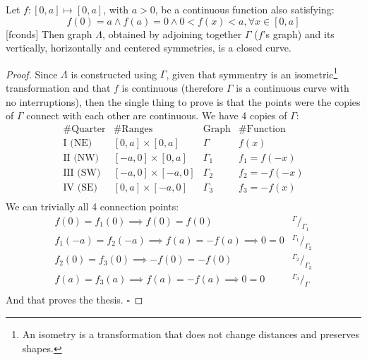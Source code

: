 \documentclass{layout}
\begin{document}
\begin{lemma}
Let $f:[0,a] \mapsto [0,a]$, with $a > 0$, be a continuous function also satisfying:
\begin{equation}
f(0)=a \wedge f(a)=0 \wedge 0 < f(x) < a, \forall x \in [0,a]
\end{equation}[fconds]
Then graph $\Lambda$, obtained by adjoining together $\Gamma$ ($f$'s graph) and
its vertically, horizontally and centered symmetries, is a closed curve.
\begin{proof}
Since $\Lambda$ is constructed using $\Gamma$, given that symmentry is an 
isometric\footnote{An isometry is a transformation that does not change distances and
preserves shapes.} 
transformation and that $f$ is continuous (therefore $\Gamma$ is a continuous curve
with no interruptions), then the single thing to prove is that the points were
the copies of $\Gamma$ connect with each other are continuous. We have 4
copies of $\Gamma$:
\begin{equation*}
\begin{array}{c|c|c|c}
\text{\# Quarter} & \text{\# Ranges} & \text{Graph} & \text{\# Function} \\
\hline
\text{I (NE)} & [0,a] \times [0,a] & \Gamma & f(x) \\
\text{II (NW)} & [-a,0] \times [0,a] & \Gamma_1 & f_1 = f(-x) \\
\text{III (SW)} & [-a,0] \times [-a,0] & \Gamma_2 & f_2 = -f(-x) \\
\text{IV (SE)} & [0,a] \times [-a,0] & \Gamma_3 & f_3 = -f(x) \\
\end{array}
\end{equation*}
We can trivially all 4 connection points:
\begin{equation*}
\begin{array}{l|c}
f(0) = f_1(0) \implies f(0) = f(0) & ^{\Gamma}/_{\Gamma_1} \\
f_1(-a) = f_2(-a) \implies f(a) = -f(a) \implies 0 = 0 & ^{\Gamma_1}/_{\Gamma_2} \\
f_2(0) = f_3(0) \implies -f(0) = -f(0) & ^{\Gamma_2}/_{\Gamma_3} \\
f(a) = f_3(a) \implies f(a) = -f(a) \implies 0 = 0 & ^{\Gamma_3}/_{\Gamma} \\
\end{array}
\end{equation*}
And that proves the thesis.
$\square$
\end{proof}
\end{lemma}
\end{document}
